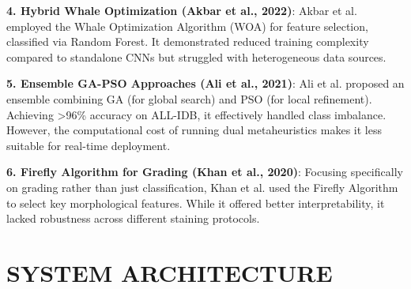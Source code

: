 \documentclass[12pt,a4paper]{article}
\begin{document}
\textbf{4. Hybrid Whale Optimization (Akbar et al., 2022)}: 
Akbar et al. \cite{akbar2022} employed the Whale Optimization Algorithm (WOA) for feature selection, classified via Random Forest. It demonstrated reduced training complexity compared to standalone CNNs but struggled with heterogeneous data sources.

\textbf{5. Ensemble GA-PSO Approaches (Ali et al., 2021)}: 
Ali et al. \cite{ali2021} proposed an ensemble combining GA (for global search) and PSO (for local refinement). Achieving >96\% accuracy on ALL-IDB, it effectively handled class imbalance. However, the computational cost of running dual metaheuristics makes it less suitable for real-time deployment.

\textbf{6. Firefly Algorithm for Grading (Khan et al., 2020)}: 
Focusing specifically on grading rather than just classification, Khan et al. \cite{khan2020} used the Firefly Algorithm to select key morphological features. While it offered better interpretability, it lacked robustness across different staining protocols.


\newpage
\section{SYSTEM ARCHITECTURE}
\end{document}
